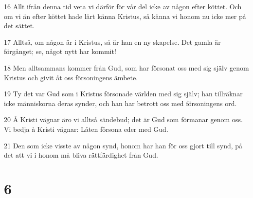 \par 16 Allt ifrån denna tid veta vi därför för vår del icke av någon efter köttet. Och om vi än efter köttet hade lärt känna Kristus, så känna vi honom nu icke mer på det sättet.
\par 17 Alltså, om någon är i Kristus, så är han en ny skapelse. Det gamla är förgånget; se, något nytt har kommit!
\par 18 Men alltsammans kommer från Gud, som har försonat oss med sig själv genom Kristus och givit åt oss försoningens ämbete.
\par 19 Ty det var Gud som i Kristus försonade världen med sig själv; han tillräknar icke människorna deras synder, och han har betrott oss med försoningens ord.
\par 20 Å Kristi vägnar äro vi alltså sändebud; det är Gud som förmanar genom oss. Vi bedja å Kristi vägnar: Låten försona eder med Gud.
\par 21 Den som icke visste av någon synd, honom har han för oss gjort till synd, på det att vi i honom må bliva rättfärdighet från Gud.

\chapter{6}

